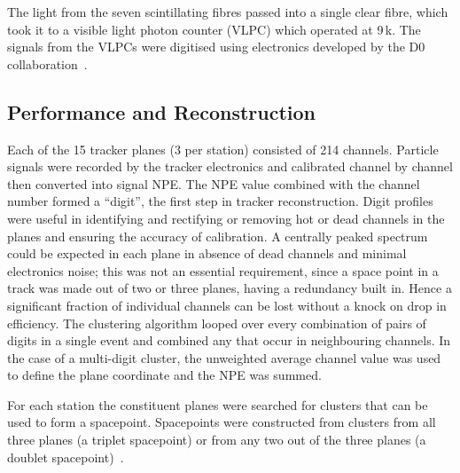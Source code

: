 The light from the seven scintillating fibres passed into a single clear fibre, which took it to a visible light photon counter (VLPC) which operated at 9\,k. The signals from the VLPCs were digitised using electronics developed by the D0 collaboration~\cite{Abazov:2005pn}.


\subsection{Performance and Reconstruction}

Each of the 15 tracker planes (3 per station) consisted of 214 channels.
Particle signals were recorded by the tracker electronics and calibrated channel by channel then converted into signal NPE. The NPE value combined with the channel number formed a ``digit'', the first step in tracker reconstruction.
Digit profiles were useful in identifying and rectifying or removing hot or dead channels in the planes and ensuring the accuracy of calibration.
A centrally peaked spectrum could be expected in each plane in absence of dead channels and minimal electronics noise; this was not an essential requirement, since a space point in a track was made out of two or three planes, having a redundancy built in.
Hence a significant fraction of individual channels can be lost without a knock on drop in efficiency. 
The clustering algorithm looped over every combination of pairs of digits in a single event and combined any that occur in neighbouring channels. In the case of a multi-digit cluster, the unweighted average channel value was used to define the plane coordinate and the NPE was summed.


For each station the constituent planes were searched for clusters that can be used to form a spacepoint.
Spacepoints were constructed from clusters from all three planes (a triplet spacepoint) or from any two out of the three planes (a doublet spacepoint)~\cite{Dobbs:2016ejn}.


